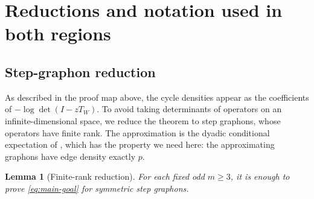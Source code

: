﻿\documentclass[11pt]{article}
\newtheorem{lemma}[theorem]{Lemma}
\numberwithin{equation}{section}
\begin{document}
\fi

\section{Reductions and notation used in both regions}\label{sec:common-operator}

\subsection{Step-graphon reduction}\label{subsec:step-reduction}

As described in the proof map above, the cycle densities appear as the coefficients of $-\log\det(I-zT_W)$.
To avoid taking determinants of operators on an infinite-dimensional space, we reduce the theorem to step graphons, whose operators have finite rank.
The approximation is the dyadic conditional expectation of \cite[Appendix~A.3.6]{Lovasz2012}, which has the property we need here: the approximating graphons have edge density exactly $p$.

\begin{lemma}[Finite-rank reduction]\label{lem:step-reduction}
  For each fixed odd $m\ge3$, it is enough to prove \eqref{eq:main-goal} for symmetric step graphons.
\end{lemma}
\end{document}
